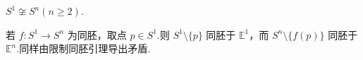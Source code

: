 \begin{instance}
    $S^1\not\cong S^n(n\ge 2)$.\par
    若 $f:S^1\to S^n$ 为同胚，取点 $p\in S^1$.则 $S^1\setminus\{p\}$ 同胚于 $\mathbb{E}^1$，而 $S^n\setminus\{f(p)\}$ 同胚于 $\mathbb{E}^n$.同样由限制同胚引理导出矛盾.
\end{instance}































